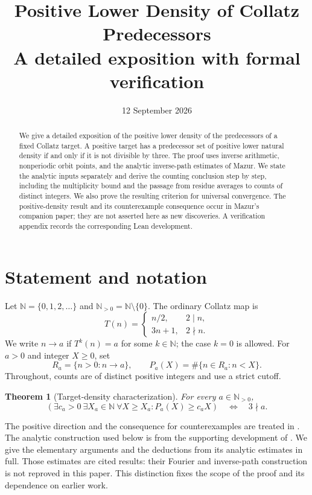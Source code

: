 \documentclass[11pt]{article}
\title{Positive Lower Density of Collatz Predecessors\\ A detailed exposition with formal verification}
\author{}
\date{12 September 2026}
\newtheorem{theorem}{Theorem}
\newcommand{\N}{\mathbb N}
\begin{document}
\maketitle
\begin{abstract}
We give a detailed exposition of the positive lower density of the
predecessors of a fixed Collatz target. A positive target has a predecessor
set of positive lower natural density if and only if it is not divisible
by three. The proof uses inverse arithmetic, nonperiodic orbit points,
and the analytic inverse-path estimates of Mazur. We state the analytic
inputs separately and derive the counting conclusion step by step,
including the multiplicity bound and the passage from residue averages
to counts of distinct integers. We also prove the resulting criterion
for universal convergence. The positive-density result and its
counterexample consequence occur in Mazur's companion paper; they are
not asserted here as new discoveries. A verification appendix records
the corresponding Lean development.
\end{abstract}
\tableofcontents
\clearpage

\section{Statement and notation}
Let $\N=\{0,1,2,\ldots\}$ and $\N_{>0}=\N\setminus\{0\}$. The ordinary
Collatz map is
\begin{equation}\label{eq:T}
 T(n)=\begin{cases}n/2,&2\mid n,\\3n+1,&2\nmid n.\end{cases}
\end{equation}
We write $n\longrightarrow a$ if $T^k(n)=a$ for some $k\in\N$;
the case $k=0$ is allowed. For $a>0$ and integer $X\ge0$, set
\begin{equation}\label{eq:count}
 R_a=\{n>0:n\longrightarrow a\},\qquad P_a(X)=\#\{n\in R_a:n<X\}.
\end{equation}
Throughout, counts are of distinct positive integers and use a strict cutoff.

\begin{theorem}[Target-density characterization]\label{thm:main}
For every $a\in\N_{>0}$,
\begin{equation}\label{eq:main}
 \left(\exists c_a>0\ \exists X_a\in\N\ \forall X\ge X_a:
 P_a(X)\ge c_aX\right)\quad\Longleftrightarrow\quad 3\nmid a.
\end{equation}
\end{theorem}
The positive direction and the consequence for counterexamples are treated
in \cite{mazur-predecessors}. The analytic construction used below is from
the supporting development of \cite{mazur-density}. We give the elementary
arguments and the deductions from its analytic estimates in full. Those
estimates are cited results: their Fourier and inverse-path construction
is not reproved in this paper. This distinction fixes the scope of the
proof and its dependence on earlier work.
\end{document}
